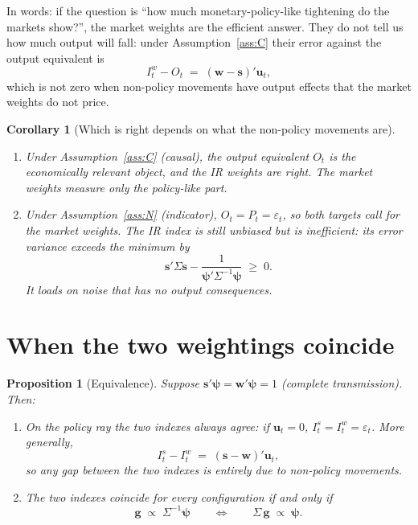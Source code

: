 \documentclass[11pt]{article}
\newtheorem{proposition}{Proposition}
\newtheorem{corollary}{Corollary}
\theoremstyle{definition}
\theoremstyle{remark}
\newcommand{\bpsi}{\boldsymbol{\psi}}
\newcommand{\bu}{\mathbf{u}}
\newcommand{\bg}{\mathbf{g}}
\newcommand{\bs}{\mathbf{s}}
\newcommand{\bw}{\mathbf{w}}
\begin{document}
\noindent In words: if the question is ``how much monetary-policy-like tightening do the markets show?'', the market weights are the efficient answer. They do not tell us how much output will fall: under Assumption~\ref{ass:C} their error against the output equivalent is
\[
I^w_t - O_t \;=\; (\bw-\bs)'\bu_t ,
\]
which is not zero when non-policy movements have output effects that the market weights do not price.

\begin{corollary}[Which is right depends on what the non-policy movements are]\label{cor:which}
\begin{enumerate}[label=(\alph*),leftmargin=2em]
\item Under Assumption~\ref{ass:C} (causal), the output equivalent $O_t$ is the economically relevant object, and the IR weights are right. The market weights measure only the policy-like part.
\item Under Assumption~\ref{ass:N} (indicator), $O_t=P_t=\varepsilon_t$, so both targets call for the market weights. The IR index is still unbiased but is inefficient: its error variance exceeds the minimum by
\[
\bs'\Sigma\bs - \frac{1}{\bpsi'\Sigma^{-1}\bpsi} \;\ge\; 0 .
\]
It loads on noise that has no output consequences.
\end{enumerate}
\end{corollary}

\section{When the two weightings coincide}

\begin{proposition}[Equivalence]\label{prop:eq}
Suppose $\bs'\bpsi=\bw'\bpsi=1$ (complete transmission). Then:
\begin{enumerate}[label=(\roman*),leftmargin=2em]
\item \emph{On the policy ray} the two indexes always agree: if $\bu_t=0$, $I^s_t=I^w_t=\varepsilon_t$. More generally,
\begin{equation}\label{eq:diff}
I^s_t - I^w_t \;=\; (\bs-\bw)'\bu_t ,
\end{equation}
so any gap between the two indexes is entirely due to non-policy movements.
\item The two indexes coincide for \emph{every} configuration if and only if
\begin{equation}\label{eq:equiv}
\bg \;\propto\; \Sigma^{-1}\bpsi \qquad\Longleftrightarrow\qquad \Sigma\,\bg \;\propto\; \bpsi .
\end{equation}
\end{enumerate}
\end{proposition}
\end{document}
